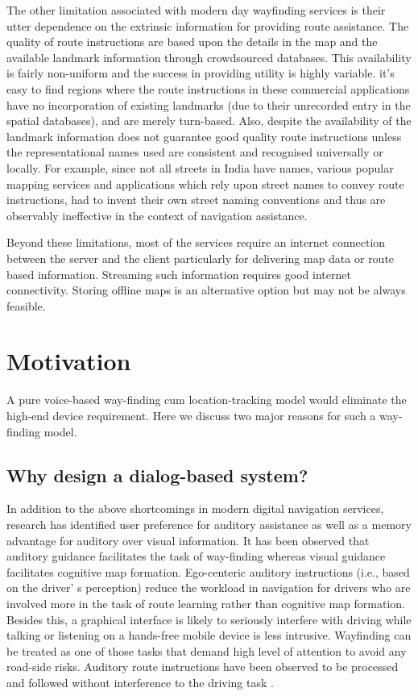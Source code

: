 \documentclass{iitkthesis}
\begin{document}
The other limitation associated with modern day wayfinding services is 
their utter dependence on the extrinsic information for providing route 
assistance. The quality of route instructions are based upon the details 
in the map and the available landmark information through crowdsourced 
databases. This availability is fairly non-uniform and the success in 
providing utility is highly variable. it's easy to find regions where the 
route instructions in these commercial applications have no incorporation 
of existing landmarks (due to their unrecorded entry in the spatial 
databases), and are merely turn-based. Also, despite the availability of 
the landmark information does not guarantee good quality route 
instructions unless the representational names used are consistent and 
recognised universally or locally. For example, since not all streets in 
India have names, various popular mapping services and applications which 
rely upon street names to convey route instructions, had to invent their 
own street naming conventions and thus are observably ineffective in the 
context of navigation assistance.

Beyond these limitations, most of the services require an internet 
connection between the server and the client particularly for 
delivering map data or route based information. Streaming such  
information requires good internet connectivity. Storing offline maps is 
an alternative option but may not be always feasible.   

\section{Motivation}
A pure voice-based way-finding cum location-tracking 
model would eliminate the high-end device requirement. Here we discuss two
major reasons for such a way-finding model. 
\subsection{Why design a dialog-based system?}
In addition to the above shortcomings in modern digital navigation 
services, research \cite{jensen2010,dalton,reagan2006} has 
identified user preference for auditory assistance as well as a memory 
advantage for auditory over visual information. It has been observed 
\cite{baldwin2009,furukawa2004} that auditory guidance facilitates the 
task of way-finding whereas visual guidance facilitates cognitive map 
formation. Ego-centeric auditory instructions (i.e., based on the driver'
s perception) reduce the workload in navigation for drivers who are 
involved more in the task of route learning rather than cognitive map 
formation. Besides this, a graphical interface is likely to seriously 
interfere with driving while talking or listening on a hands-free mobile 
device is less intrusive. Wayfinding 
can be treated as one of those tasks that demand high level of attention 
to avoid any road-side risks. Auditory route instructions have been 
observed to be processed and followed without interference to the driving 
task \cite{jensen2010,dalton}.
\end{document}
